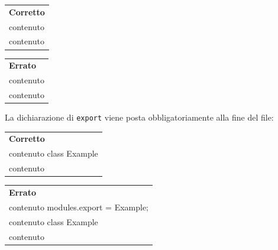 \begin{minipage}{0.45\textwidth}
	\begin{tabular}{p{\textwidth}}	
		\textbf{Corretto}
		\begin{lstlisting}
		var axios = require("axios")
		
		class Example {
		\\contenuto
		}
		
		class SecondExample {
		\\contenuto
		}
		\end{lstlisting}
	\end{tabular}
\end{minipage}
\hfill
\begin{minipage}{0.45\textwidth}
	\begin{tabular}{|p{\textwidth}}		
		\textbf{Errato}
		\begin{lstlisting}
		class Example{
		\\contenuto
		}
		
		var axios = require("axios")
		
		class SecondExample {
		\\contenuto
		}
		\end{lstlisting}
	\end{tabular}
	
\end{minipage}
\newpage
La dichiarazione di \texttt{export} viene posta obbligatoriamente alla fine del file:\\

\begin{minipage}{0.45\textwidth}
	\begin{tabular}{p{\textwidth}}	
		\textbf{Corretto}
		\begin{lstlisting}
		\\contenuto
		class Example {
		\\contenuto
		}

		modules.export = Example;
		\end{lstlisting}
	\end{tabular}
\end{minipage}
\hfill
\begin{minipage}{0.45\textwidth}
	\begin{tabular}{|p{\textwidth}}		
		\textbf{Errato}
		\begin{lstlisting}
		\\contenuto
		modules.export = Example;
		\\contenuto
		class Example {
		\\contenuto
		}
		\end{lstlisting}
	\end{tabular}
	
\end{minipage}

